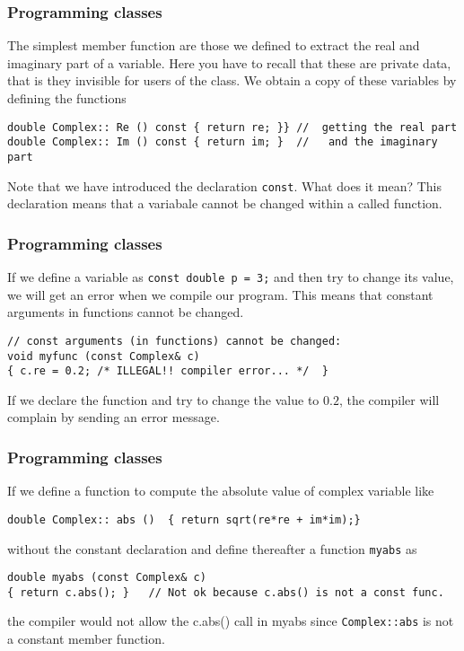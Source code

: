 \documentclass{beamer}
\begin{document}
\begin{frame}
\frametitle{Programming classes}

The simplest member function are those we defined to extract
the real and imaginary part of a variable. Here you have to recall that these are private data,
that is they invisible for users of the class.  We obtain a copy of these variables by defining the
functions

\begin{verbatim}
double Complex:: Re () const { return re; }} //  getting the real part
double Complex:: Im () const { return im; }  //   and the imaginary part
\end{verbatim}
Note that we have introduced   the declaration  \Verb!const!.  What does it mean?
This declaration means that a variabale cannot be changed within  a called function.
\end{frame}

\begin{frame}
\frametitle{Programming classes}

If we define a variable as
\Verb!const double p = 3;! and then try to change its value, we will get an error when we
compile our program. This means that constant arguments in functions cannot be changed.

\begin{verbatim}
// const arguments (in functions) cannot be changed:
void myfunc (const Complex& c)
{ c.re = 0.2; /* ILLEGAL!! compiler error... */  }
\end{verbatim}
If we declare the function and try to change the value to $0.2$, the compiler will complain by sending
an error message.
\end{frame}

\begin{frame}
\frametitle{Programming classes}

If we define a function to compute the absolute value of complex variable like

\begin{verbatim}
double Complex:: abs ()  { return sqrt(re*re + im*im);}
\end{verbatim}
without the constant declaration  and define thereafter a function
\Verb!myabs! as

\begin{verbatim}
double myabs (const Complex& c)
{ return c.abs(); }   // Not ok because c.abs() is not a const func.
\end{verbatim}
the compiler would not allow the c.abs() call in myabs
since \Verb!Complex::abs! is not a constant member function.
\end{frame}
\end{document}
